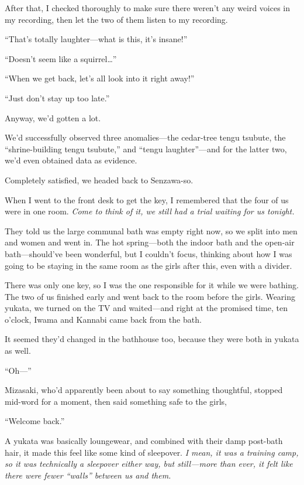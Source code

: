 \documentclass[
    a4paper,
    12pt,
    twoside,
    openany,
    UTF8,
    fontset=windows
]{ctexbook}
\begin{document}
After that, I checked thoroughly to make sure there weren't any weird voices in my recording, then let the two of them listen to my recording.

``That's totally laughter---what is this, it's insane!''

``Doesn't seem like a squirrel\dots''

``When we get back, let's all look into it right away!''

``Just don't stay up too late.''

Anyway, we'd gotten a lot.

We'd successfully observed three anomalies---the cedar-tree tengu tsubute, the ``shrine-building tengu tsubute,'' and ``tengu laughter''---and for the latter two, we'd even obtained data as evidence.

Completely satisfied, we headed back to Senzawa-so.

When I went to the front desk to get the key, I remembered that the four of us were in one room. \textit{Come to think of it, we still had a trial waiting for us tonight.}

They told us the large communal bath was empty right now, so we split into men and women and went in. The hot spring---both the indoor bath and the open-air bath---should've been wonderful, but I couldn't focus, thinking about how I was going to be staying in the same room as the girls after this, even with a divider.

There was only one key, so I was the one responsible for it while we were bathing. The two of us finished early and went back to the room before the girls. Wearing yukata, we turned on the TV and waited---and right at the promised time, ten o'clock, Iwama and Kannabi came back from the bath.

It seemed they'd changed in the bathhouse too, because they were both in yukata as well.

``Oh---''

Mizasaki, who'd apparently been about to say something thoughtful, stopped mid-word for a moment, then said something safe to the girls,

``Welcome back.''

A yukata was basically loungewear, and combined with their damp post-bath hair, it made this feel like some kind of sleepover. \textit{I mean, it was a training camp, so it was technically a sleepover either way, but still---more than ever, it felt like there were fewer ``walls'' between us and them.}
\end{document}
